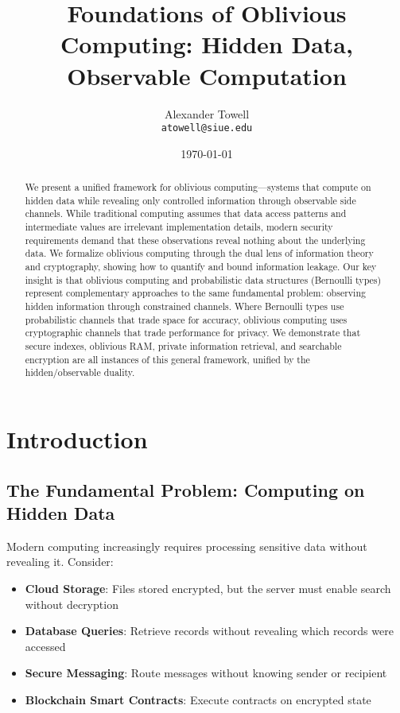 \documentclass[11pt,final]{article}
\title{Foundations of Oblivious Computing: Hidden Data, Observable Computation}
\author{
    Alexander Towell\\
    \texttt{atowell@siue.edu}
}
\date{\today}
\begin{document}
\maketitle

\begin{abstract}
We present a unified framework for oblivious computing—systems that compute on hidden data while revealing only controlled information through observable side channels. While traditional computing assumes that data access patterns and intermediate values are irrelevant implementation details, modern security requirements demand that these observations reveal nothing about the underlying data. We formalize oblivious computing through the dual lens of information theory and cryptography, showing how to quantify and bound information leakage. Our key insight is that oblivious computing and probabilistic data structures (Bernoulli types) represent complementary approaches to the same fundamental problem: observing hidden information through constrained channels. Where Bernoulli types use probabilistic channels that trade space for accuracy, oblivious computing uses cryptographic channels that trade performance for privacy. We demonstrate that secure indexes, oblivious RAM, private information retrieval, and searchable encryption are all instances of this general framework, unified by the hidden/observable duality.
\end{abstract}


\section{Introduction}

\subsection{The Fundamental Problem: Computing on Hidden Data}

Modern computing increasingly requires processing sensitive data without revealing it. Consider:

\begin{itemize}
    \item \textbf{Cloud Storage}: Files stored encrypted, but the server must enable search without decryption
    \item \textbf{Database Queries}: Retrieve records without revealing which records were accessed
    \item \textbf{Secure Messaging}: Route messages without knowing sender or recipient
    \item \textbf{Blockchain Smart Contracts}: Execute contracts on encrypted state
\end{itemize}
\end{document}
